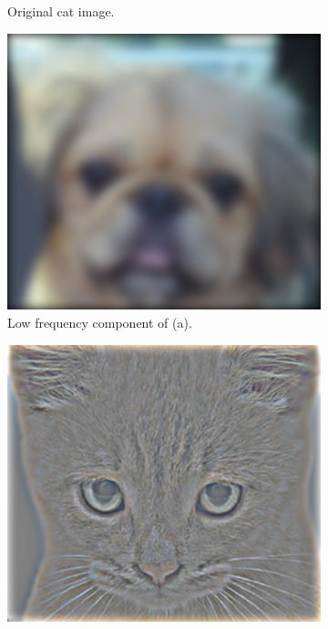 \documentclass{article}
\begin{document}
\begin{figure}[!htb]
\begin{subfigure}{.35\textwidth}
  \caption{Original cat image.}
\end{subfigure}
\begin{subfigure}{.35\textwidth}
  \centering
  \includegraphics[width=1\textwidth]{low_frequencies.jpg}
  \caption{Low frequency component of (a).}
\end{subfigure}%
\begin{subfigure}{.35\textwidth}
  \centering
  \includegraphics[width=1\textwidth]{high_frequencies.jpg}

\end{subfigure}
\end{figure}
\end{document}
